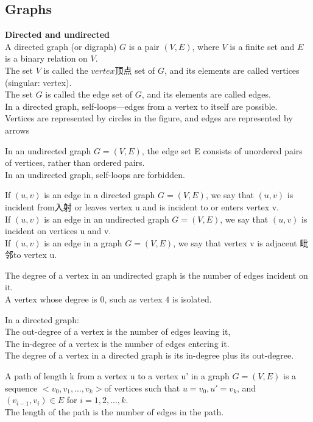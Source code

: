 \documentclass{article}
\begin{document}
\subsection{Graphs}
\textbf{Directed and undirected}\\
A directed graph (or digraph) $G$ is a pair $(V, E)$, where $V$ is a finite set and $E$ is a binary relation on $V$. \\
The set $V$ is called the $vertex顶点$ set of $G$, and its elements are called vertices (singular: vertex).\\
The set $G$ is called the edge set of $G$, and its elements are called edges.\\
In a directed graph, self-loops---edges from a vertex to itself are possible.\\
Vertices are represented by circles in the figure, and edges are represented by arrows

In an undirected graph $G = (V, E)$, the edge set E consists of unordered pairs of vertices, rather than ordered pairs.\\
In an undirected graph, self-loops are forbidden.

\bigskip
If $(u, v)$ is an edge in a directed graph $G = (V, E)$, we say that $(u, v)$ is incident from入射 or leaves vertex u and is incident to or enters vertex v.\\
If $(u, v)$ is an edge in an undirected graph $G = (V, E)$, we say that $(u, v)$ is incident on vertices u and v.\\
If $(u, v)$ is an edge in a graph $G = (V, E)$, we say that vertex v is adjacent 毗邻to vertex u.

The degree of a vertex in an undirected graph is the number of edges incident on it.\\
A vertex whose degree is $0$, such as vertex $4$ is isolated.

\bigskip
In a directed graph:\\
The out-degree of a vertex is the number of edges leaving it,\\
The in-degree of a vertex is the number of edges entering it.\\
The degree of a vertex in a directed graph is its in-degree plus its out-degree.

A path of length k from a vertex u to a vertex u' in a graph $G = (V, E)$ is a sequence $<v_0, v_1, \ldots, v_k>$of vertices such that $u = v_0, u' =v_k$, and $(v_{i-1}, v_i) \in E$ for $i = 1, 2,..., k$. \\
The length of the path is the number of edges in the path.
\end{document}
